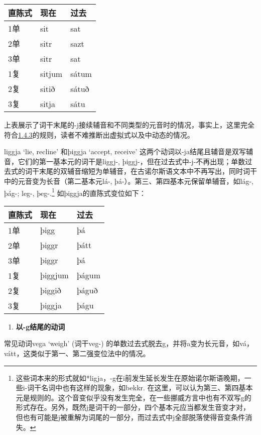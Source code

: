 \begin{longtable}{lll}
\toprule
直陈式 & 现在 & 过去 \\
\midrule
\endhead
\bottomrule
\endfoot
1单 & sit & sat \\
2单 & sitr & sazt \\
3单 & sitr & sat \\
1复 & sitjum & sátum \\
2复 & sitið & sátuð \\
3复 & sitja & sátu \\
\end{longtable}

上表展示了词干末尾的-j接续辅音和不同类型的元音时的情况，事实上，这里完全符合\hyperref[ux534aux5143ux97f3ux7684ux4fddux6301ux6027]{1.4.3}的规则，读者不难推断出虚拟式以及中动态的情况。

liggja `lie, recline‌' 和þiggja `accept, receive‌'
这两个动词以-ja结尾且辅音是双写辅音，它们的第一基本元的词干是liggj-,
þiggj-，但在过去式中-j-不再出现；单数过去式的词干末尾的双辅音缩短为单辅音，在古诺尔斯语文本中不再写出，同时词干中的元音变为长音（第二基本元lá-,
þá-）。第三、第四基本元保留单辅音，如lág-, þág-; leg-, þeg-.\footnote{这些词本来的形式就如*ligja，-g在i前发生延长发生在原始诺尔斯语晚期，一些i-词干名词中也有这样的现象，如bekkr.
  在这里，可以认为第三、第四基本元是规则的。这个音变似乎没有发生完全，在一些挪威方言中也有不双写g的形式存在。另外，既然j是词干的一部分，四个基本元应当都发生音变才对，但也有可能是j被重解为词尾的一部分，而过去式中j全部脱落使得音变条件消失。}
如þiggja的直陈式变位如下：

\begin{longtable}{lll}
\toprule
直陈式 & 现在 & 过去 \\
\midrule
\endhead
\bottomrule
\endfoot
1单 & þigg & þá \\
2单 & þiggr & þátt \\
3单 & þiggr & þá \\
1复 & þiggjum & þágum \\
2复 & þiggið & þáguð \\
3复 & þiggja & þágu \\
\end{longtable}

\begin{enumerate}
\def\labelenumi{\arabic{enumi})}
\setcounter{enumi}{1}
\item
  \textbf{以-g结尾的动词}
\end{enumerate}

常见动词vega `weigh‌' (词干veg-)
的单数过去式脱去g，并将a变为长元音，如vá，vátt，这类似于第一、第二强变位法中的情况。

